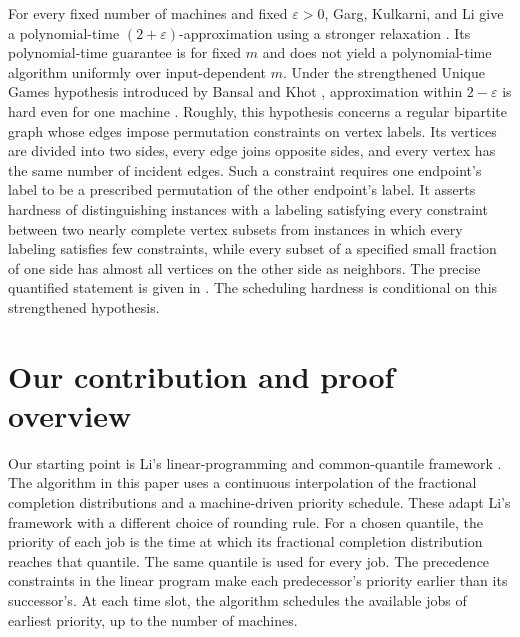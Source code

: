 For every fixed number of machines and fixed $\varepsilon>0$, Garg, Kulkarni, and Li give a
polynomial-time $(2+\varepsilon)$-approximation using a stronger
relaxation \cite[Theorem~1.1]{GKL2019}. Its polynomial-time guarantee is
for fixed $m$ and does not yield a polynomial-time algorithm uniformly
over input-dependent $m$. Under the strengthened Unique Games hypothesis
introduced by Bansal and Khot \cite{BK2009}, approximation within
$2-\varepsilon$ is hard even for one machine \cite[Introduction]{GKL2019}.
Roughly, this hypothesis concerns a regular bipartite graph whose edges
impose permutation constraints on vertex labels. Its vertices are divided
into two sides, every edge joins opposite sides, and every vertex has the
same number of incident edges.
Such a constraint requires one endpoint's label to be a prescribed permutation
of the other endpoint's label.
It asserts hardness of distinguishing instances with a labeling satisfying
every constraint between two nearly complete vertex subsets from instances in which every
labeling satisfies few constraints, while every subset of a specified small
fraction of one side has almost all vertices on the other side as neighbors. The precise quantified
statement is given in \cite[Hypothesis~1]{Svensson2011}. The scheduling hardness
is conditional on this strengthened hypothesis.

\section{Our contribution and proof overview}

Our starting point is Li's linear-programming and common-quantile
framework \cite[Section~3]{Li2017}. The algorithm in this paper uses a
continuous interpolation of the fractional completion distributions and
a machine-driven priority schedule. These adapt Li's framework with a
different choice of rounding rule. For
a chosen quantile, the priority of each job is the time at which its
fractional completion distribution reaches that quantile. The same
quantile is used for every job. The precedence constraints in the linear
program make each predecessor's priority earlier than its successor's.
At each time slot, the algorithm schedules the available jobs of earliest
priority, up to the number of machines.

